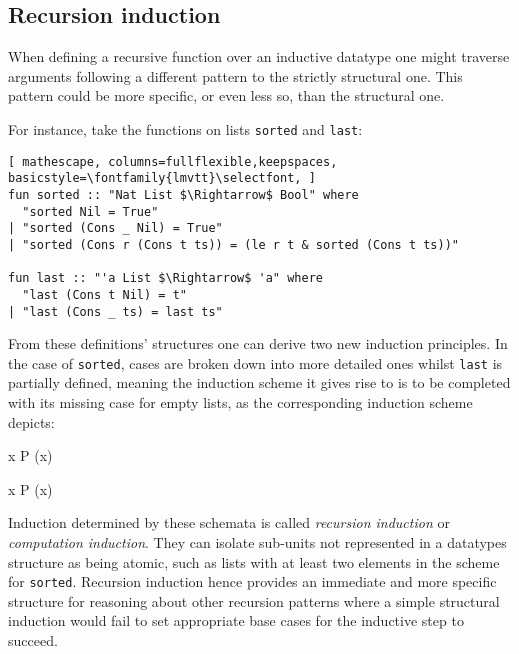 \label{sec:rec-ind}

\subsection{Recursion induction}

When defining a recursive function over an inductive datatype one might traverse arguments following a different pattern to the strictly structural one.
%
This pattern could be more specific, or even less so, than the structural one.

For instance, take the functions on lists \texttt{\selectfont sorted} and \texttt{\selectfont last}:

\begin{lstlisting}[ mathescape, columns=fullflexible,keepspaces, basicstyle=\fontfamily{lmvtt}\selectfont, ]
fun sorted :: "Nat List $\Rightarrow$ Bool" where
  "sorted Nil = True"
| "sorted (Cons _ Nil) = True"
| "sorted (Cons r (Cons t ts)) = (le r t & sorted (Cons t ts))"

fun last :: "'a List $\Rightarrow$ 'a" where
  "last (Cons t Nil) = t"
| "last (Cons _ ts) = last ts"
\end{lstlisting}

\noindent From these definitions' structures one can derive two new induction principles.
%
In the case of \texttt{\selectfont sorted}, cases are broken down into more detailed ones whilst \texttt{\selectfont last} is partially defined, meaning the induction scheme it gives rise to is to be completed with its missing case for empty lists, as the corresponding induction scheme depicts:

  {\forall x \; P (x)}

  {\forall x \; P (x)}

Induction determined by these schemata is called \emph{recursion induction} or \emph{computation induction}.
%
They can isolate sub-units not represented in a datatypes structure as being atomic, such as lists with at least two elements in the scheme for \texttt{\selectfont sorted}.
%
Recursion induction hence provides an immediate and more specific structure for reasoning about other recursion patterns where a simple structural induction would fail to set appropriate base cases for the inductive step to succeed.

